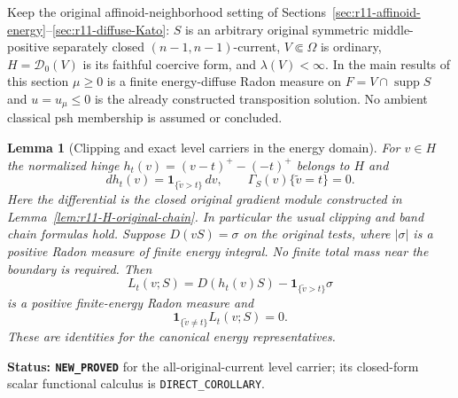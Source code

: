 \documentclass[11pt,a4paper]{article}
\numberwithin{equation}{section}
\newtheorem{lemma}[theorem]{Lemma}
\theoremstyle{definition}
\theoremstyle{remark}
\begin{document}
Keep the original affinoid-neighborhood setting of
Sections~\ref{sec:r11-affinoid-energy}--\ref{sec:r11-diffuse-Kato}:
$S$ is an arbitrary original symmetric middle-positive separately
closed $(n-1,n-1)$-current, $V\Subset\Omega$ is ordinary,
$H=\mathscr D_0(V)$ is its faithful coercive form, and
$\lambda(V)<\infty$.  In the main results of this section
$\mu\ge0$ is a finite energy-diffuse Radon measure on
$F=V\cap\operatorname{supp}S$ and $u=u_\mu\le0$ is the
already constructed transposition solution.  No ambient classical
psh membership is assumed or concluded.

\begin{lemma}[Clipping and exact level carriers in the energy domain]
\label{lem:r11-H-level-carrier}
For $v\in H$ the normalized hinge
$h_t(v)=(v-t)^+-(-t)^+$ belongs to $H$ and
\[
 d h_t(v)=\mathbf1_{\{\widetilde v>t\}}\,dv,
 \qquad \Gamma_S(v)\{\widetilde v=t\}=0.
 \tag{RT1}
\]
Here the differential is the closed original gradient module
constructed in Lemma~\ref{lem:r11-H-original-chain}.
In particular the usual clipping and band chain formulas hold.
Suppose $D(vS)=\sigma$ on the original tests, where $|\sigma|$
is a positive Radon measure of finite energy integral.
No finite total mass near the boundary is required.
Then
\[
 L_t(v;S)=D(h_t(v)S)
                    -\mathbf1_{\{\widetilde v>t\}}\sigma
 \tag{RT2}
\]
is a positive finite-energy Radon measure and
\[
                    \mathbf1_{\{\widetilde v\ne t\}}L_t(v;S)=0.
 \tag{RT3}
\]
These are identities for the canonical energy representatives.
\end{lemma}

\noindent\textbf{Status: \texttt{NEW\_PROVED}} for the
all-original-current level carrier; its closed-form scalar
functional calculus is \texttt{DIRECT\_COROLLARY}.
\end{document}
